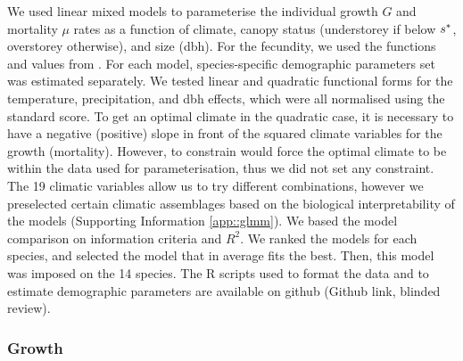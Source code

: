 We used linear mixed models to parameterise the individual growth $ G $ and mortality $
\mu $ rates as a function of climate, canopy status (understorey if below $ {s}^{*} $, overstorey otherwise),
and size (dbh). For the fecundity, we used the functions and values from
\citet{Purves2008}. For each model, species-specific demographic parameters set was
estimated separately. We tested linear and quadratic functional forms for the temperature, precipitation, and dbh effects, which were all normalised using the standard score. To get an optimal climate in the quadratic case, it is necessary to have a negative (positive) slope in front of the squared climate variables for the growth (mortality). However, to constrain would force the optimal climate to be within the data used for parameterisation, thus we did not set any constraint. The 19 climatic variables allow us to try different combinations, however we preselected certain climatic assemblages based on the biological interpretability of the models (Supporting Information \ref{app::glmm}). We based the model comparison on information criteria and $ R^2 $. We ranked the models for each species, and selected the model that in average fits the best. Then, this model was imposed on the 14 species. The R scripts used to format the data and to estimate demographic parameters are available on github (Github link, blinded review).

\subsubsection{Growth}

